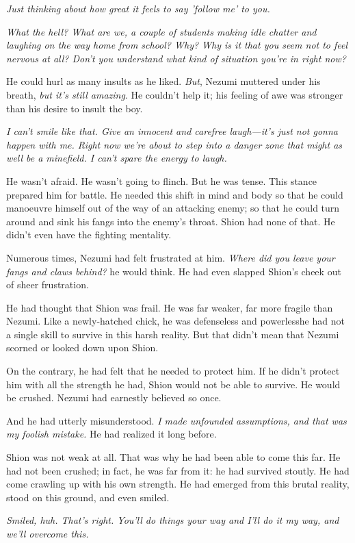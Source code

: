 \emph{Just thinking about how great it feels to say 'follow me' to you.}

\emph{What the hell? What are we, a couple of students making idle chatter and
laughing on the way home from school? Why? Why is it that you seem not
to feel nervous at all? Don't you understand what kind of situation
you're in right now?}

He could hurl as many insults as he liked. \emph{But}, Nezumi muttered under
his breath, \emph{but it's still amazing}. He couldn't help it; his feeling of
awe was stronger than his desire to insult the boy.

\emph{I can't smile like that. Give an innocent and carefree laugh---it's just
not gonna happen with me. Right now we're about to step into a danger
zone that might as well be a minefield. I can't spare the energy to
laugh.}

He wasn't afraid. He wasn't going to flinch. But he was tense. This
stance prepared him for battle. He needed this shift in mind and body so
that he could manoeuvre himself out of the way of an attacking enemy; so
that he could turn around and sink his fangs into the enemy's throat.
Shion had none of that. He didn't even have the fighting mentality.

Numerous times, Nezumi had felt frustrated at him. \emph{Where did you leave
your fangs and claws behind?} he would think. He had even slapped Shion's
cheek out of sheer frustration.

He had thought that Shion was frail. He was far weaker, far more fragile
than Nezumi. Like a newly-hatched chick, he was defenseless and
powerless\el he had not a single skill to survive in this harsh reality.
But that didn't mean that Nezumi scorned or looked down upon Shion.

On the contrary, he had felt that he needed to protect him. If he didn't
protect him with all the strength he had, Shion would not be able to
survive. He would be crushed. Nezumi had earnestly believed so once.

And he had utterly misunderstood. \emph{I made unfounded assumptions, and that
was my foolish mistake.} He had realized it long before.

Shion was not weak at all. That was why he had been able to come this
far. He had not been crushed; in fact, he was far from it: he had
survived stoutly. He had come crawling up with his own strength. He had
emerged from this brutal reality, stood on this ground, and even smiled.

\emph{Smiled, huh. That's right. You'll do things your way and I'll do it my
way, and we'll overcome this.}

